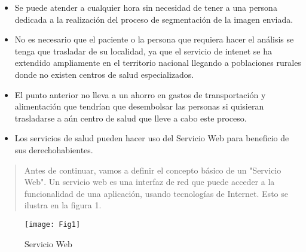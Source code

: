 \documentclass[12pt,letterpaper,titlepage]{article}
\begin{document}
\begin{itemize}\itemsep=0pt
\item  Se puede atender a cualquier hora sin necesidad de tener a una persona dedicada
 a la realización del proceso de segmentación de la imagen enviada.\\
\item No es necesario que el paciente o la persona que requiera hacer el análisis se 
tenga que trasladar de su localidad, ya que el servicio de intenet se ha extendido 
ampliamente en el territorio nacional llegando a poblaciones rurales donde no 
existen centros de salud especializados.\\
\item El punto anterior no lleva a un ahorro en gastos de transportación y alimentación 
que tendrían que desembolsar las personas si quisieran trasladarse 
a aún centro de salud que lleve a cabo este proceso.\\
\item Los servicios de salud pueden hacer uso del Servicio Web para beneficio de sus derechohabientes.\\
\end{itemize}

\begin{quotation}
Antes de continuar, vamos a definir el concepto básico de un "Servicio Web". Un servicio web es una interfaz de red que puede acceder a la funcionalidad de una aplicación, usando tecnologías de Internet. Esto se ilustra en la figura 1. \cite{119}
\end{quotation}

\begin{figure}
  \centering
    \texttt{[image: Fig1]}
  \caption{Servicio Web}
  \label{fig1:SW}
\end{figure}
\end{document}
